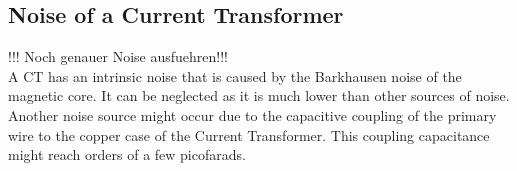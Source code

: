 \subsection{Noise of a Current Transformer}

!!! Noch genauer Noise ausfuehren!!!\\
A CT has an intrinsic noise that is caused by the Barkhausen noise of the magnetic core. It can be neglected as it is much lower than other sources of noise. %
Another noise source might occur due to the capacitive coupling of the primary wire to the copper case of the Current Transformer. This coupling capacitance might reach orders of a few picofarads. %




